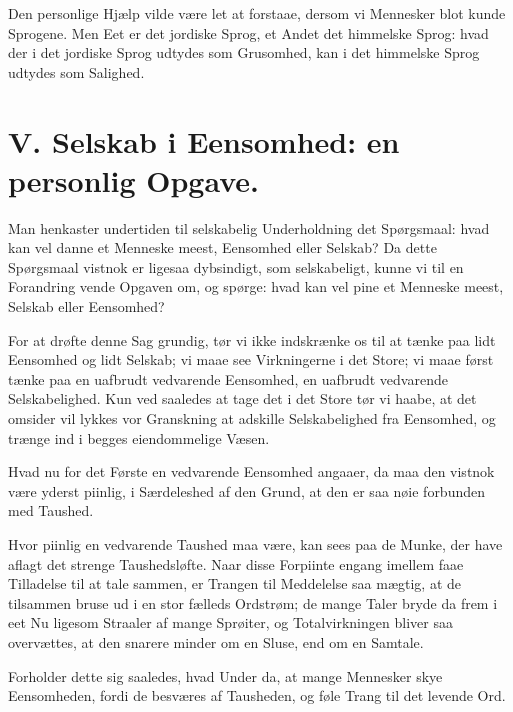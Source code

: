 \documentclass[12pt,a4paper]{book}
\newcommand{\apage}[1]{\marginnote{\footnotesize\textit{[#1]}}}
\begin{document}
Den personlige Hjælp vilde være let at forstaae, dersom vi Mennesker
blot kunde Sprogene. Men Eet er det jordiske Sprog, et Andet det
himmelske Sprog: hvad der i det jordiske Sprog udtydes som Grusomhed,
kan i det himmelske Sprog udtydes som Salighed.

\chapter*{V. Selskab i Eensomhed: en personlig Opgave.}
\label{ch:forel5}
 \apage{43}

Man henkaster undertiden til selskabelig Underholdning det Spørgsmaal: hvad kan vel danne et Menneske meest, Eensomhed eller Selskab? Da dette Spørgsmaal vistnok er ligesaa dybsindigt, som selskabeligt, kunne vi til en Forandring vende Opgaven om, og spørge: hvad kan vel pine et Menneske meest, Selskab eller Eensomhed?

For at drøfte denne Sag grundig, tør vi ikke indskrænke os til at tænke paa lidt Eensomhed og lidt Selskab; vi maae see Virkningerne i det Store; vi maae først tænke paa en uafbrudt vedvarende Eensomhed, en uafbrudt vedvarende Selskabelighed. Kun ved saaledes at tage det i det Store tør vi haabe, at det omsider vil lykkes vor Granskning at adskille Selskabelighed fra Eensomhed, og trænge ind i begges eiendommelige Væsen.

Hvad nu for det Første en vedvarende Eensomhed angaaer, da maa den vistnok være yderst piinlig, i Særdeleshed af den Grund, at den er saa nøie forbunden med Taushed.

Hvor piinlig en vedvarende Taushed maa være, kan sees paa de Munke, der have aflagt det strenge Taushedsløfte. Naar disse Forpiinte engang imellem faae Tilladelse til at tale sammen, er Trangen til Meddelelse saa mægtig, at de \apage{44}
tilsammen bruse ud i en stor fælleds Ordstrøm; de mange Taler bryde da frem i eet Nu ligesom Straaler af mange Sprøiter, og Totalvirkningen bliver saa overvættes, at den snarere minder om en Sluse, end om en Samtale.

Forholder dette sig saaledes, hvad Under da, at mange Mennesker skye Eensomheden, fordi de besværes af Tausheden, og føle Trang til det levende Ord.
\end{document}
